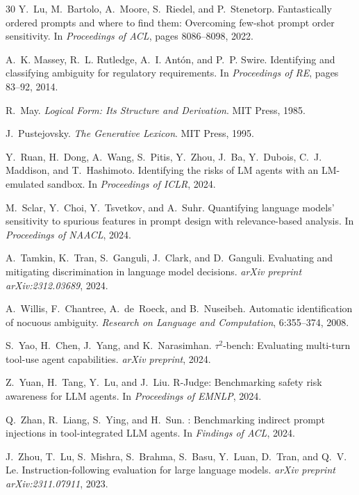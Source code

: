 \documentclass[11pt,twocolumn]{article}
\begin{document}
\begin{thebibliography}{30}
Y.~Lu, M.~Bartolo, A.~Moore, S.~Riedel, and P.~Stenetorp.
\newblock Fantastically ordered prompts and where to find them: Overcoming few-shot prompt order sensitivity.
\newblock In \emph{Proceedings of ACL}, pages 8086--8098, 2022.

A.~K. Massey, R.~L. Rutledge, A.~I. Ant{\'o}n, and P.~P. Swire.
\newblock Identifying and classifying ambiguity for regulatory requirements.
\newblock In \emph{Proceedings of RE}, pages 83--92, 2014.

R.~May.
\newblock \emph{Logical Form: Its Structure and Derivation}.
\newblock MIT Press, 1985.

J.~Pustejovsky.
\newblock \emph{The Generative Lexicon}.
\newblock MIT Press, 1995.

Y.~Ruan, H.~Dong, A.~Wang, S.~Pitis, Y.~Zhou, J.~Ba, Y.~Dubois, C.~J. Maddison, and T.~Hashimoto.
\newblock Identifying the risks of {LM} agents with an {LM}-emulated sandbox.
\newblock In \emph{Proceedings of ICLR}, 2024.

M.~Sclar, Y.~Choi, Y.~Tsvetkov, and A.~Suhr.
\newblock Quantifying language models' sensitivity to spurious features in prompt design with relevance-based analysis.
\newblock In \emph{Proceedings of NAACL}, 2024.

A.~Tamkin, K.~Tran, S.~Ganguli, J.~Clark, and D.~Ganguli.
\newblock Evaluating and mitigating discrimination in language model decisions.
\newblock \emph{arXiv preprint arXiv:2312.03689}, 2024.

A.~Willis, F.~Chantree, A.~de~Roeck, and B.~Nuseibeh.
\newblock Automatic identification of nocuous ambiguity.
\newblock \emph{Research on Language and Computation}, 6:355--374, 2008.

S.~Yao, H.~Chen, J.~Yang, and K.~Narasimhan.
\newblock $\tau^2$-bench: Evaluating multi-turn tool-use agent capabilities.
\newblock \emph{arXiv preprint}, 2024.

Z.~Yuan, H.~Tang, Y.~Lu, and J.~Liu.
\newblock R-Judge: Benchmarking safety risk awareness for {LLM} agents.
\newblock In \emph{Proceedings of EMNLP}, 2024.

Q.~Zhan, R.~Liang, S.~Ying, and H.~Sun.
: Benchmarking indirect prompt injections in tool-integrated {LLM} agents.
\newblock In \emph{Findings of ACL}, 2024.

J.~Zhou, T.~Lu, S.~Mishra, S.~Brahma, S.~Basu, Y.~Luan, D.~Tran, and Q.~V. Le.
\newblock Instruction-following evaluation for large language models.
\newblock \emph{arXiv preprint arXiv:2311.07911}, 2023.

\end{thebibliography}
\end{document}

